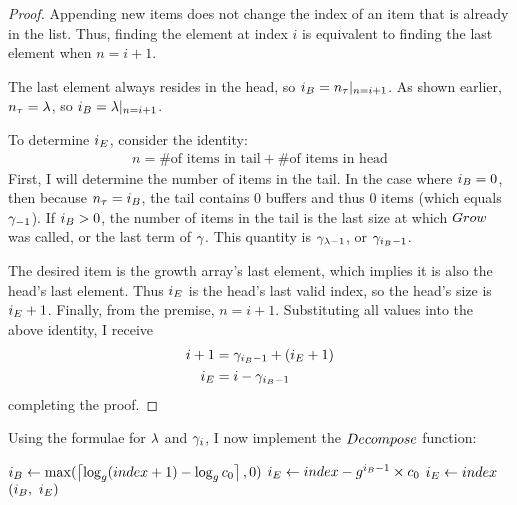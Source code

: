\begin{proof}
	Appending new items does not change the index of an item that is already in the list. Thus, finding the element at index $i$ is equivalent to finding the last element when $n = i + 1$.
	
	The last element always resides in the head, so $i_B = n_\tau|_{n = i + 1}$. As shown earlier, $n_\tau = \lambda$, so $i_B = \lambda|_{n = i + 1}$.
	
	To determine $i_E$, consider the identity:
	\begin{align*}
	n = \text{\# of items in tail} + \text{\# of items in head}
	\end{align*}
	First, I will determine the number of items in the tail. In the case where $i_B = 0$, then because $n_\tau = i_B$, the tail contains $0$ buffers and thus $0$ items (which equals $\gamma_{-1}$). If $i_B > 0$, the number of items in the tail is the last size at which $Grow$ was called, or the last term of $\gamma$. This quantity is $\gamma_{\lambda - 1}$, or $\gamma_{i_B - 1}$.
	
	The desired item is the growth array's last element, which implies it is also the head's last element. Thus $i_E$ is the head's last valid index, so the head's size is $i_E + 1$. Finally, from the premise, $n = i + 1$. Substituting all values into the above identity, I receive
	\begin{align*}
	i + 1 &= \gamma_{i_B - 1} + (i_E + 1)\\
	i_E &= i - \gamma_{i_B - 1}
	\end{align*}
	completing the proof.
\end{proof}

Using the formulae for $\lambda$ and $\gamma_i$, I now implement the $\FuncDecompose$ function:

\begin{algorithm}
	\begin{algorithmic}
		\Function{$\FuncDecompose$}{$\ParamIndex$}
			\State $i_B \gets \max(\left\lceil \log_{g} (index + 1) - \log_{g} c_0 \right\rceil, 0)$
				\State $i_E \gets index - g^{i_B - 1} \times c_0$
			\Else
				\State $i_E \gets index$
			\EndIf
			\State \Return $(\LclIndexBuffer,\ \LclIndexElement)$
		\EndFunction
	\end{algorithmic}
\end{algorithm}

